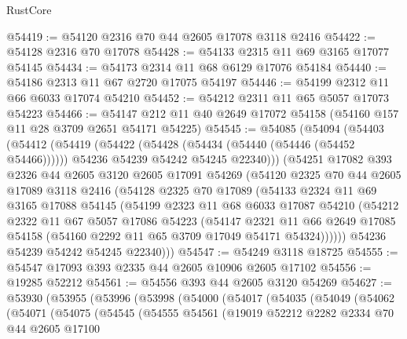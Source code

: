 \begin{lexlean}{RustCore}
\begin{coremodule}
@54419 := @54120 @2316 @70 @44 @2605 @17078 @3118 @2416
@54422 := @54128 @2316 @70 @17078
@54428 := @54133 @2315 @11 @69 @3165 @17077 @54145
@54434 := @54173 @2314 @11 @68 @6129 @17076 @54184
@54440 := @54186 @2313 @11 @67 @2720 @17075 @54197
@54446 := @54199 @2312 @11 @66 @6033 @17074 @54210
@54452 := @54212 @2311 @11 @65 @5057 @17073 @54223
@54466 := @54147 @212 @11 @40 @2649 @17072 @54158 (@54160 @157 @11 @28 @3709 @2651 @54171 @54225)
@54545 := @54085
    (@54094
      (@54403
        (@54412
          (@54419
            (@54422 (@54428 (@54434 (@54440 (@54446 (@54452 @54466))))))
            @54236
            @54239
            @54242
            @54245
            @22340)))
      (@54251
        @17082
        @393
        @2326
        @44
        @2605
        @3120
        @2605
        @17091
        @54269
        (@54120
          @2325
          @70
          @44
          @2605
          @17089
          @3118
          @2416
          (@54128
            @2325
            @70
            @17089
            (@54133
              @2324
              @11
              @69
              @3165
              @17088
              @54145
              (@54199
                @2323
                @11
                @68
                @6033
                @17087
                @54210
                (@54212
                  @2322
                  @11
                  @67
                  @5057
                  @17086
                  @54223
                  (@54147
                    @2321
                    @11
                    @66
                    @2649
                    @17085
                    @54158
                    (@54160 @2292 @11 @65 @3709 @17049 @54171 @54324))))))
          @54236
          @54239
          @54242
          @54245
          @22340)))
@54547 := @54249 @3118 @18725
@54555 := @54547 @17093 @393 @2335 @44 @2605 @10906 @2605 @17102
@54556 := @19285 @52212
@54561 := @54556 @393 @44 @2605 @3120 @54269
@54627 := @53930
    (@53955
      (@53996
        (@53998
          (@54000
            (@54017
              (@54035
                (@54049
                  (@54062
                    (@54071
                      (@54075
                        (@54545
                          (@54555
                            @54561
                            (@19019
                              @52212
                              @2282
                              @2334
                              @70
                              @44
                              @2605
                              @17100

\end{coremodule}
\end{lexlean}
